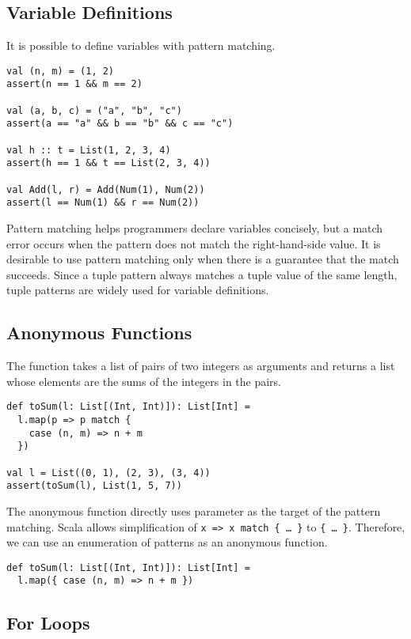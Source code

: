 \subsection{Variable Definitions}

It is possible to define variables with pattern matching.

\begin{verbatim}
val (n, m) = (1, 2)
assert(n == 1 && m == 2)

val (a, b, c) = ("a", "b", "c")
assert(a == "a" && b == "b" && c == "c")

val h :: t = List(1, 2, 3, 4)
assert(h == 1 && t == List(2, 3, 4))

val Add(l, r) = Add(Num(1), Num(2))
assert(l == Num(1) && r == Num(2))
\end{verbatim}

Pattern matching helps programmers declare variables concisely, but a match error occurs
when the pattern does not match the right-hand-side value. It is desirable to use
pattern matching only when there is a guarantee that the match succeeds. Since
a tuple pattern always matches a tuple value of the same length,
tuple patterns are widely used for variable definitions.

\subsection{Anonymous Functions}

The function  takes a list of pairs of two integers as arguments and
returns a list whose elements are the sums of the integers in the pairs.

\begin{verbatim}
def toSum(l: List[(Int, Int)]): List[Int] =
  l.map(p => p match {
    case (n, m) => n + m
  })

val l = List((0, 1), (2, 3), (3, 4))
assert(toSum(l), List(1, 5, 7))
\end{verbatim}

The anonymous function directly uses parameter  as the target of the
pattern matching. Scala allows simplification of \verb!x => x match { … }! to
\verb!{ … }!. Therefore, we can use an enumeration of patterns as an anonymous
function.

\begin{verbatim}
def toSum(l: List[(Int, Int)]): List[Int] =
  l.map({ case (n, m) => n + m })
\end{verbatim}

\subsection{For Loops}

